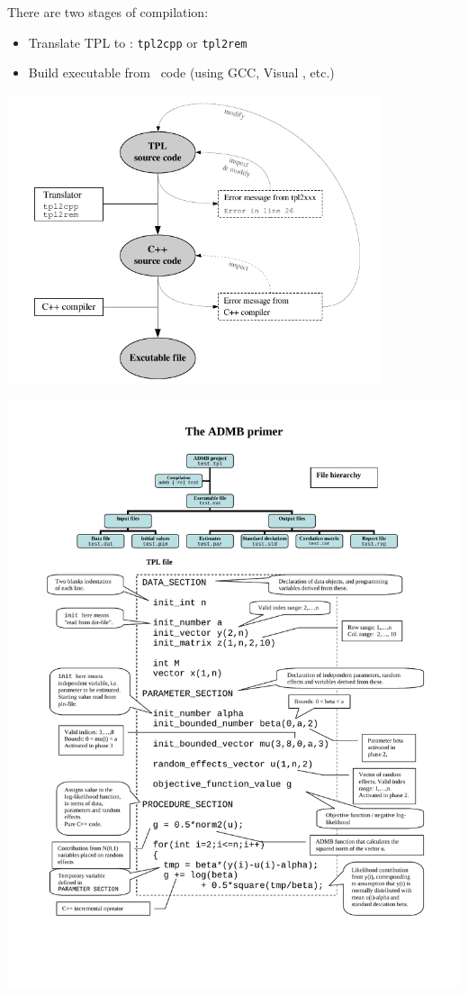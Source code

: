 \documentclass{admbmanual}
\begin{document}
\noindent There are two stages of compilation:
\begin{itemize}
  \item Translate TPL to \cplus: \texttt{tpl2cpp} or \texttt{tpl2rem}
  \item Build executable from \cplus\ code (using GCC, Visual \cplus, etc.)
\end{itemize}
\begin{center}
  \includegraphics[width=11cm]{compiling-diagram}
\end{center}

\hskip-2pc\includegraphics[width=18cm]{ADMBprim.pdf}%




\printindex
\end{document}
